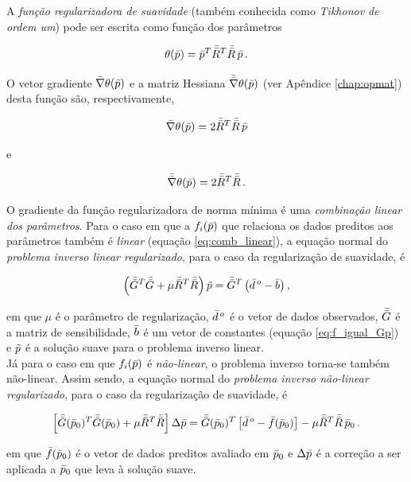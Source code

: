 \indent A {\it função regularizadora de suavidade} (também conhecida como
{\it Tikhonov de ordem um}) pode ser escrita como função dos
parâmetros

\begin{equation}
\theta(\bar{p}) = \bar{p}^T \bar{\bar{R}}^T \bar{\bar{R}}\thinspace\bar{p} \thinspace .
\label{eq:suavidade}
\end{equation}

\noindent O vetor gradiente $\bar{\nabla}\theta(\bar{p})$ e a matriz Hessiana
$\bar{\bar{\nabla}}\theta(\bar{p})$ (ver Apêndice \ref{chap:opmat}) desta função
são, respectivamente,

\begin{equation}
\bar{\nabla}\theta(\bar{p}) = 2\bar{\bar{R}}^T \bar{\bar{R}}\thinspace\bar{p}
\end{equation}

\noindent e

\begin{equation}
\bar{\bar{\nabla}}\theta(\bar{p}) = 2\bar{\bar{R}}^T \bar{\bar{R}} \thinspace .
\end{equation}

\indent O gradiente da função regularizadora de norma mínima é uma
{\it combinação linear dos parâmetros}.
Para o caso em que a $f_i(\bar{p})$ que relaciona
os dados preditos aos parâmetros também é {\it linear} (equação \ref{eq:comb_linear}),
a equação normal do {\it problema inverso linear regularizado},
para o caso da regularização de suavidade, é

\begin{equation}
\left(\bar{\bar{G}}^T\bar{\bar{G}} + \mu\bar{\bar{R}}^T\bar{\bar{R}}\right)\tilde{p} =
    \bar{\bar{G}}^T\left(\bar{d}^{\thinspace o} - \bar{b} \right) ,
\end{equation}

\noindent em que $\mu$ é o parâmetro de regularização, $\bar{d}^{\thinspace o}$
é o vetor de dados observados, $\bar{\bar{G}}$ é a matriz de sensibilidade, $\bar{b}$
é um vetor de constantes (equação \ref{eq:f_igual_Gp}) e $\tilde{p}$ é a solução
suave para o problema inverso linear.
\\
\indent Já para o caso em que $f_i(\bar{p})$ é {\it não-linear}, o problema
inverso torna-se também não-linear. Assim sendo, a equação normal do
{\it problema inverso não-linear regularizado}, para o caso da regularização de
suavidade, é

\begin{equation}
\left[\bar{\bar{G}}(\bar{p}_0)^T\bar{\bar{G}}(\bar{p}_0) +
      \mu\bar{\bar{R}}^T\bar{\bar{R}}\right]\Delta\bar{p} =
\bar{\bar{G}}(\bar{p}_0)^T \left[\bar{d}^{\thinspace o} - \bar{f}(\bar{p}_0)\right] -
\mu\bar{\bar{R}}^T\bar{\bar{R}}\thinspace\bar{p}_0
    \thinspace .
\end{equation}

\noindent em que $\bar{f}(\bar{p}_0)$ é o vetor de dados preditos avaliado em
$\bar{p}_0$ e $\Delta\bar{p}$ é a correção a ser aplicada a $\bar{p}_0$
que leva à solução suave.
